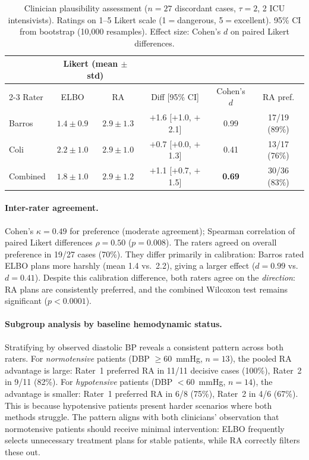 \documentclass{article}
\begin{document}
\begin{table}[h]
\centering
\caption{Clinician plausibility assessment ($n = 27$ discordant cases, $\tau = 2$, 2 ICU intensivists). Ratings on 1--5 Likert scale (1$=$dangerous, 5$=$excellent). 95\% CI from bootstrap (10,000 resamples). Effect size: Cohen's $d$ on paired Likert differences.}
\label{tab:clinician}
\small
\begin{tabular}{l cc c c c}
\toprule
& \multicolumn{2}{c}{Likert (mean $\pm$ std)} & & & \\
\cmidrule(lr){2-3}
Rater & ELBO & RA & Diff [95\% CI] & Cohen's $d$ & RA pref. \\
\midrule
Barros  & $1.4 \pm 0.9$ & $2.9 \pm 1.3$ & $+$1.6 [$+$1.0, $+$2.1] & 0.99 & 17/19 (89\%) \\
Coli    & $2.2 \pm 1.0$ & $2.9 \pm 1.0$ & $+$0.7 [$+$0.0, $+$1.3] & 0.41 & 13/17 (76\%) \\
\midrule
Combined & $1.8 \pm 1.0$ & $2.9 \pm 1.2$ & $+$1.1 [$+$0.7, $+$1.5] & \textbf{0.69} & 30/36 (83\%) \\
\bottomrule
\end{tabular}
\end{table}

\paragraph{Inter-rater agreement.} Cohen's $\kappa = 0.49$ for preference (moderate agreement); Spearman correlation of paired Likert differences $\rho = 0.50$ ($p = 0.008$). The raters agreed on overall preference in 19/27 cases (70\%). They differ primarily in calibration: Barros rated ELBO plans more harshly (mean 1.4 vs.\ 2.2), giving a larger effect ($d = 0.99$ vs.\ $d = 0.41$). Despite this calibration difference, both raters agree on the \emph{direction}: RA plans are consistently preferred, and the combined Wilcoxon test remains significant ($p < 0.0001$).

\paragraph{Subgroup analysis by baseline hemodynamic status.} Stratifying by observed diastolic BP reveals a consistent pattern across both raters. For \emph{normotensive} patients (DBP $\geq 60$~mmHg, $n = 13$), the pooled RA advantage is large: Rater~1 preferred RA in 11/11 decisive cases (100\%), Rater~2 in 9/11 (82\%). For \emph{hypotensive} patients (DBP $< 60$~mmHg, $n = 14$), the advantage is smaller: Rater~1 preferred RA in 6/8 (75\%), Rater~2 in 4/6 (67\%). This is because hypotensive patients present harder scenarios where both methods struggle. The pattern aligns with both clinicians' observation that normotensive patients should receive minimal intervention: ELBO frequently selects unnecessary treatment plans for stable patients, while RA correctly filters these out.
\end{document}
